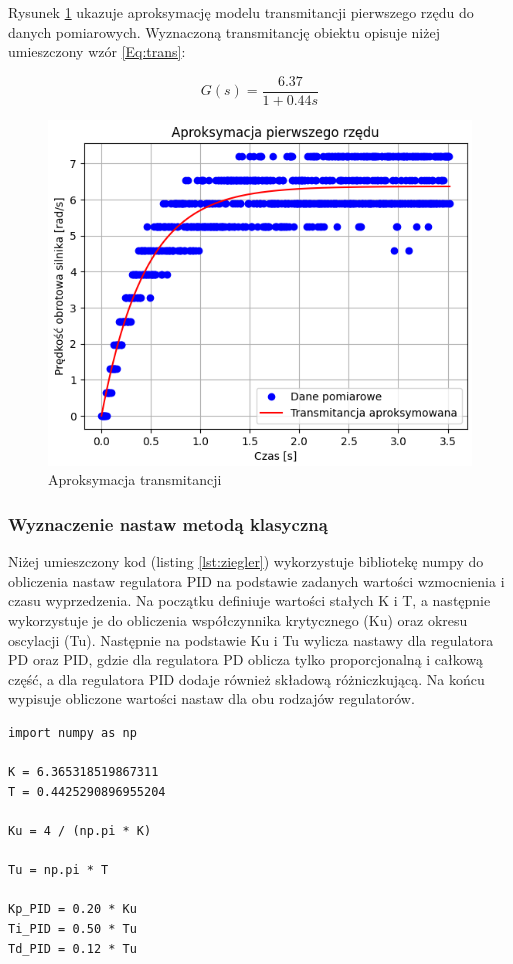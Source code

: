 \documentclass[12pt,twoside]{article}
\begin{document}
Rysunek \ref{Fig:aprox} ukazuje aproksymację modelu transmitancji pierwszego rzędu do danych pomiarowych. Wyznaczoną transmitancję obiektu opisuje niżej umieszczony wzór \ref{Eq:trans}:

\begin{equation}
G(s) = \frac{6.37}{1 + 0.44s}
\label{Eq:trans}
\end{equation}

\begin{figure}[ht]%
 \centering%
 \includegraphics[width=12cm]{figures/PID/aprox.png}%
 \caption{Aproksymacja transmitancji}%
 \label{Fig:aprox}%
\end{figure}

\newpage

\subsubsection{Wyznaczenie nastaw metodą klasyczną}

Niżej umieszczony kod (listing \ref{lst:ziegler}) wykorzystuje bibliotekę numpy do obliczenia nastaw regulatora PID na podstawie zadanych wartości wzmocnienia i czasu wyprzedzenia. Na początku definiuje wartości stałych K i T, a następnie wykorzystuje je do obliczenia współczynnika krytycznego (Ku) oraz okresu oscylacji (Tu). Następnie na podstawie Ku i Tu wylicza nastawy dla regulatora PD oraz PID, gdzie dla regulatora PD oblicza tylko proporcjonalną i całkową część, a dla regulatora PID dodaje również składową różniczkującą. Na końcu wypisuje obliczone wartości nastaw dla obu rodzajów regulatorów.

\begin{lstlisting}[caption={Kod z obliczeniami i wyświetleniem wyników}, label={lst:ziegler}]
import numpy as np

K = 6.365318519867311
T = 0.4425290896955204

Ku = 4 / (np.pi * K)

Tu = np.pi * T

Kp_PID = 0.20 * Ku
Ti_PID = 0.50 * Tu
Td_PID = 0.12 * Tu
\end{lstlisting}
\end{document}
